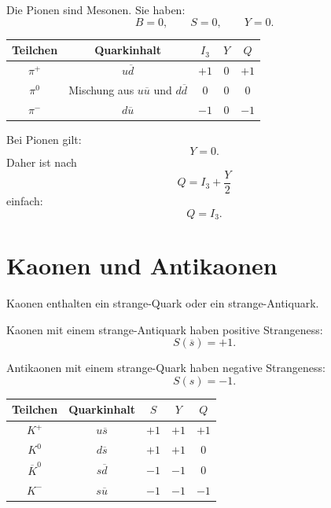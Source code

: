 \begin{conceptbox}
Die Pionen sind Mesonen.
Sie haben:
\[
    B=0,
    \qquad
    S=0,
    \qquad
    Y=0.
\]
\end{conceptbox}

\begin{center}
\begin{tabular}{|c|c|c|c|c|}
\hline
Teilchen & Quarkinhalt & $I_3$ & $Y$ & $Q$ \\
\hline
$\pi^+$ & $u\overline{d}$ & $+1$ & $0$ & $+1$ \\
\hline
$\pi^0$ & Mischung aus $u\overline{u}$ und $d\overline{d}$ & $0$ & $0$ & $0$ \\
\hline
$\pi^-$ & $d\overline{u}$ & $-1$ & $0$ & $-1$ \\
\hline
\end{tabular}
\end{center}

\begin{examtipbox}
Bei Pionen gilt:
\[
    Y=0.
\]
Daher ist nach
\[
    Q=I_3+\frac{Y}{2}
\]
einfach:
\[
    Q=I_3.
\]
\end{examtipbox}

\section{Kaonen und Antikaonen}

Kaonen enthalten ein strange-Quark oder ein strange-Antiquark.

\begin{conceptbox}
Kaonen mit einem strange-Antiquark haben positive Strangeness:
\[
    S(\overline{s})=+1.
\]

Antikaonen mit einem strange-Quark haben negative Strangeness:
\[
    S(s)=-1.
\]
\end{conceptbox}

\begin{center}
\begin{tabular}{|c|c|c|c|c|}
\hline
Teilchen & Quarkinhalt & $S$ & $Y$ & $Q$ \\
\hline
$K^+$ & $u\overline{s}$ & $+1$ & $+1$ & $+1$ \\
\hline
$K^0$ & $d\overline{s}$ & $+1$ & $+1$ & $0$ \\
\hline
$\overline{K}^0$ & $s\overline{d}$ & $-1$ & $-1$ & $0$ \\
\hline
$K^-$ & $s\overline{u}$ & $-1$ & $-1$ & $-1$ \\
\hline
\end{tabular}
\end{center}

